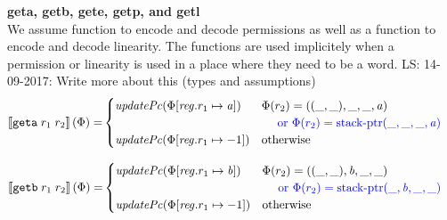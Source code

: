 \documentclass[a4paper]{article}
\newcommand\lau[1]{{\color{purple} \sf \footnotesize {LS: #1}}\\}
\newcommand{\sem}[1]{\left\llbracket #1 \right\rrbracket}
\newcommand{\tor}{\text{ or }}
\newcommand{\totherwise}{\text{otherwise }}
\newcommand{\sourcecolor}{\color{blue}}
\newcommand{\src}[1]{{\sourcecolor #1}}
\newcommand{\targetcolor}[1]{\color{black}}
\newcommand{\trg}[1]{{\targetcolor{} #1}}
\newcommand{\zinstr}[1]{\texttt{#1}}
\newcommand{\twoinstr}[3]{
  \ifthenelse{\equal{#2#3}{}}
  {\zinstr{#1}}
  {\zinstr{#1} \; #2 \; #3}
}
\newcommand{\tgeta}[2]{\twoinstr{\trg{geta}}{#1}{#2}}
\newcommand{\tgetb}[2]{\twoinstr{\trg{getb}}{#1}{#2}}
\newcommand{\update}[2]{[#1 \mapsto #2]}
\newcommand{\updReg}[2]{\update{\reg.#1}{#2}}
\newcommand{\stkptr}[1]{\mathrm{stack\text{-}ptr}(#1)}
\newcommand{\var}[1]{\mathit{#1}}
\newcommand{\reg}{\var{reg}}
\newcommand{\baddr}{\var{b}}
\newcommand{\aaddr}{\var{a}}
\newcommand{\plainfun}[2]{
  \ifthenelse{\equal{#2}{}}
  {\mathit{#1}}
  {\mathit{#1}(#2)}
}
\newcommand{\updPcAddr}[1]{\plainfun{updatePc}{#1}}
\begin{document}
\noindent\textbf{geta, getb, gete, getp, and getl}\\
We assume function to encode and decode permissions as well as a function to encode and decode linearity. The functions are used implicitely when a permission or linearity is used in a place where they need to be a word.
\lau{14-09-2017: Write more about this (types and assumptions)}
\begin{align*}
  \sem{\tgeta{r_1}{r_2}}(\Phi) = & 
                                   \begin{cases}
                                     \updPcAddr{\Phi\updReg{r_1}{\aaddr}} & 
                                     \arraycolsep=0pt
                                     \begin{array}[t]{l}
                                       \Phi(r_2) = ((\_,\_),\_,\_,\aaddr) \\
                                       \quad \src{\tor \Phi(r_2) = \stkptr{\_,\_,\_,\aaddr} } \\
                                     \end{array} \\
                                     \updPcAddr{\Phi\updReg{r_1}{-1}} & \totherwise
                                   \end{cases}
\end{align*}

\begin{align*}
  \sem{\tgetb{r_1}{r_2}}(\Phi) = & 
                                   \begin{cases}
                                     \updPcAddr{\Phi\updReg{r_1}{\baddr}} & 
                                     \arraycolsep=0pt
                                     \begin{array}[t]{l}
                                       \Phi(r_2) = ((\_,\_),\baddr,\_,\_) \\
                                       \quad \src{\tor \Phi(r_2) = \stkptr{\_,\baddr,\_,\_} } \\
                                     \end{array} \\
                                     \updPcAddr{\Phi\updReg{r_1}{-1}} & \totherwise
                                   \end{cases}
\end{align*}
\end{document}
